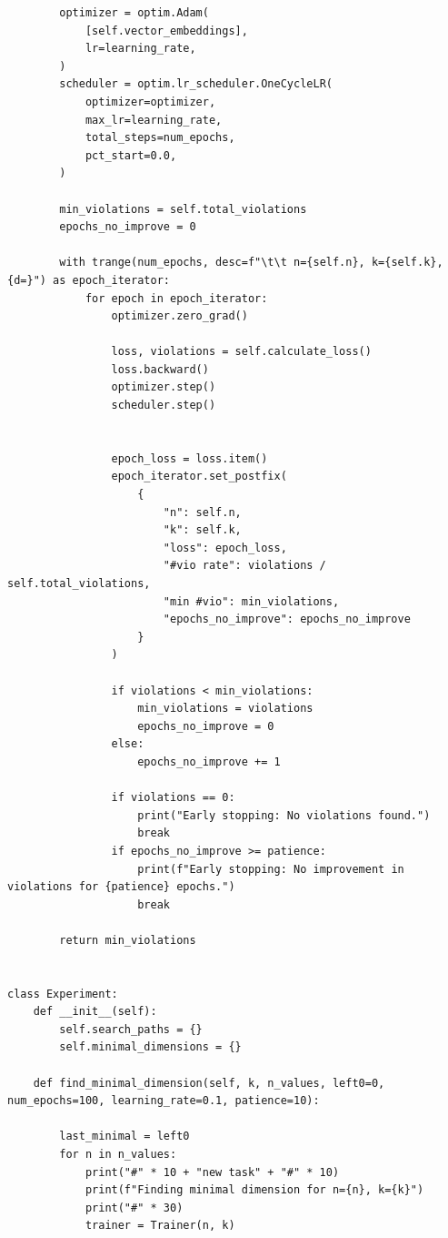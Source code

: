 \begin{lstlisting}
        optimizer = optim.Adam(
            [self.vector_embeddings],
            lr=learning_rate,
        )
        scheduler = optim.lr_scheduler.OneCycleLR(
            optimizer=optimizer,
            max_lr=learning_rate,
            total_steps=num_epochs,
            pct_start=0.0,
        )

        min_violations = self.total_violations
        epochs_no_improve = 0

        with trange(num_epochs, desc=f"\t\t n={self.n}, k={self.k}, {d=}") as epoch_iterator:
            for epoch in epoch_iterator:
                optimizer.zero_grad()

                loss, violations = self.calculate_loss()
                loss.backward()
                optimizer.step()
                scheduler.step()


                epoch_loss = loss.item()
                epoch_iterator.set_postfix(
                    {
                        "n": self.n,
                        "k": self.k,
                        "loss": epoch_loss,
                        "#vio rate": violations / self.total_violations,
                        "min #vio": min_violations,
                        "epochs_no_improve": epochs_no_improve
                    }
                )

                if violations < min_violations:
                    min_violations = violations
                    epochs_no_improve = 0
                else:
                    epochs_no_improve += 1

                if violations == 0:
                    print("Early stopping: No violations found.")
                    break
                if epochs_no_improve >= patience:
                    print(f"Early stopping: No improvement in violations for {patience} epochs.")
                    break

        return min_violations


class Experiment:
    def __init__(self):
        self.search_paths = {}
        self.minimal_dimensions = {}

    def find_minimal_dimension(self, k, n_values, left0=0, num_epochs=100, learning_rate=0.1, patience=10):

        last_minimal = left0
        for n in n_values:
            print("#" * 10 + "new task" + "#" * 10)
            print(f"Finding minimal dimension for n={n}, k={k}")
            print("#" * 30)
            trainer = Trainer(n, k)


\end{lstlisting}
